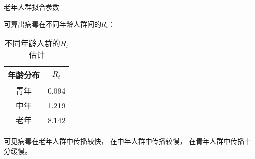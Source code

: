 \begin{table}[H]
    \centering
    \caption{老年人群拟合参数}
    
\end{table}
\par 可算出病毒在不同年龄人群间的$R_t$：
\begin{table}[H]
    \centering
    \caption{不同年龄人群的$R_t$估计\label{table:年龄rt估计}}
    \begin{tabular}{cc}
        \hline
        年龄分布 & $R_t$ \\
        \hline
        青年     & 0.094 \\
        中年     & 1.219 \\
        老年     & 8.142 \\
        \hline
    \end{tabular}
\end{table}
\par 可见病毒在老年人群中传播较快，
在中年人群中传播较慢，
在青年人群中传播十分缓慢。

